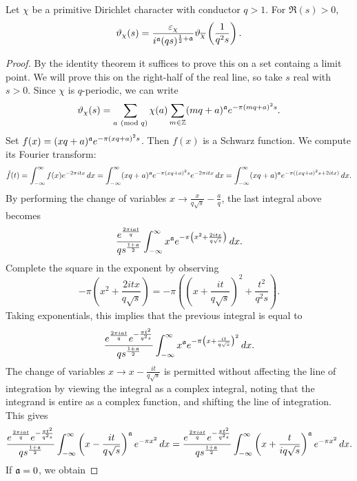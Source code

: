       \begin{theorem}
        Let $\chi$ be a primitive Dirichlet character with conductor $q > 1$. For $\Re(s) > 0$,
        \[
          \vartheta_{\chi}(s) = \frac{\varepsilon_{\chi}}{i^{\mathfrak{a}}(qs)^{\frac{1}{2}+\mathfrak{a}}}\vartheta_{\overline{\chi}}\left(\frac{1}{q^{2}s}\right).
        \]
      \end{theorem}
      \begin{proof}
        By the identity theorem it suffices to prove this on a set containg a limit point. We will prove this on the right-half of the real line, so take $s$ real with $s > 0$. Since $\chi$ is $q$-periodic, we can write
        \[
          \vartheta_{\chi}(s) = \sum_{a \ \left(\text{mod }q\right)}\chi(a)\sum_{m \in \mathbb{Z}}(mq+a)^{\mathfrak{a}}e^{-\pi(mq+a)^{2}s}.
        \]
        Set $f(x) = (xq+a)^{\mathfrak{a}}e^{-\pi(xq+a)^{2}s}$. Then $f(x)$ is a Schwarz function. We compute its Fourier transform:
        \[
          \hat{f}(t) = \int_{-\infty}^{\infty}f(x)e^{-2\pi itx}\,dx = \int_{-\infty}^{\infty}(xq+a)^{\mathfrak{a}}e^{-\pi(xq+a)^{2}s}e^{-2\pi itx}\,dx = \int_{-\infty}^{\infty}(xq+a)^{\mathfrak{a}}e^{-\pi((xq+a)^{2}s+2itx)}\,dx.
        \]
        By performing the change of variables $x \to \frac{x}{q\sqrt{s}}-\frac{a}{q}$, the last integral above becomes
        \[
          \frac{e^{\frac{2\pi iat}{q}}}{qs^{\frac{1+\mathfrak{a}}{2}}}\int_{-\infty}^{\infty}x^{\mathfrak{a}}e^{-\pi\left(x^{2}+\frac{2itx}{q\sqrt{s}}\right)}\,dx.
        \]
        Complete the square in the exponent by observing
        \[
          -\pi\left(x^{2}+\frac{2itx}{q\sqrt{s}}\right) = -\pi\left(\left(x+\frac{it}{q\sqrt{s}}\right)^{2}+\frac{t^{2}}{q^{2}s}\right).
        \]
        Taking exponentials, this implies that the previous integral is equal to
        \[
          \frac{e^{\frac{2\pi iat}{q}}e^{-\frac{\pi t^{2}}{q^{2}s}}}{qs^{\frac{1+\mathfrak{a}}{2}}}\int_{-\infty}^{\infty}x^{\mathfrak{a}}e^{-\pi\left(x+\frac{it}{q\sqrt{s}}\right)^{2}}\,dx.
        \]
        The change of variables $x \to x-\frac{it}{q\sqrt{s}}$ is permitted without affecting the line of integration by viewing the integral as a complex integral, noting that the integrand is entire as a complex function, and shifting the line of integration. This gives
        \[
          \frac{e^{\frac{2\pi iat}{q}}e^{-\frac{\pi t^{2}}{q^{2}s}}}{qs^{\frac{1+\mathfrak{a}}{2}}}\int_{-\infty}^{\infty}\left(x-\frac{it}{q\sqrt{s}}\right)^{\mathfrak{a}}e^{-\pi x^{2}}\,dx = \frac{e^{\frac{2\pi iat}{q}}e^{-\frac{\pi t^{2}}{q^{2}s}}}{qs^{\frac{1+\mathfrak{a}}{2}}}\int_{-\infty}^{\infty}\left(x+\frac{t}{iq\sqrt{s}}\right)^{\mathfrak{a}}e^{-\pi x^{2}}\,dx.
        \]
        If $\mathfrak{a} = 0$, we obtain

\end{proof}
